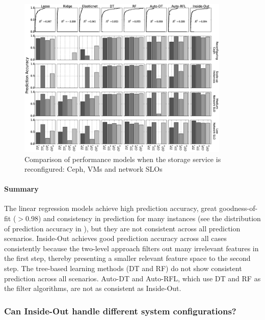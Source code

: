 \begin{figure}
    \centering
    \includegraphics[width=0.9\textwidth]{Chapter-InsideOut/figures/unseen_configuration_all_new.eps}
    \caption{Comparison of performance models when the storage service is reconfigured: Ceph, VMs and network SLOs}
    \label{fig:reconfiguring_storage}
\end{figure}


\paragraph*{Summary}
The linear regression models achieve high prediction accuracy, great goodness-of-fit ($>0.98$) and consistency in prediction 
for many instances (see the distribution of prediction accuracy in \myfigure{\ref{fig:changing_workload}}), but they 
are not consistent across all prediction scenarios.
Inside-Out achieves good prediction accuracy across all cases consistently because the two-level approach 
filters out many irrelevant features in the first step, thereby presenting a smaller relevant feature space to the second step. 
The tree-based learning methods (DT and RF) do not show consistent prediction across all scenarios.
Auto-DT and Auto-RFL, which use DT and RF as the filter algorithms, are not as consistent as Inside-Out.

\vspace{1ex}

\subsubsection{Can Inside-Out handle different system configurations?}
\label{sec:unseen_configuration}

